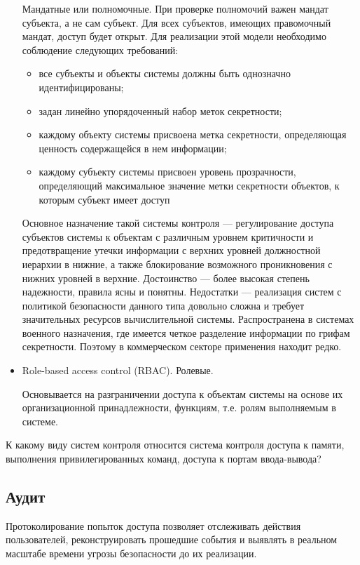 \begin{itemize}
Мандатные или полномочные. При проверке полномочий важен мандат субъекта, а не сам субъект. Для всех субъектов, имеющих правомочный мандат, доступ будет открыт.
Для реализации этой модели необходимо соблюдение следующих требований:
\begin{itemize}
\item все субъекты и объекты системы должны быть однозначно идентифицированы;
\item задан линейно упорядоченный набор меток секретности;
\item каждому объекту системы присвоена метка секретности, определяющая ценность содержащейся в нем информации;
\item каждому субъекту системы присвоен уровень прозрачности, определяющий максимальное значение метки секретности объектов, к которым субъект имеет доступ
\end{itemize}

Основное назначение такой системы контроля --- регулирование доступа субъектов системы к объектам с различным уровнем критичности и предотвращение утечки информации с верхних уровней должностной иерархии в нижние, а также блокирование возможного проникновения с нижних уровней в верхние.
Достоинство --- более высокая степень надежности, правила ясны и понятны.
Недостатки --- реализация систем с политикой безопасности данного типа довольно сложна и требует значительных ресурсов вычислительной системы. Распространена в системах военного назначения, где имеется четкое разделение информации по грифам секретности. Поэтому в коммерческом секторе применения находит редко.

\item Role-based access control (RBAC). Ролевые. 

Основывается на разграничении доступа к объектам системы на основе их организационной принадлежности, функциям, т.е. ролям выполняемым в системе.

\end{itemize}


К какому виду систем контроля относится система контроля доступа к памяти, выполнения привилегированных команд, доступа к портам ввода-вывода?


\subsection{Аудит}

Протоколирование попыток доступа позволяет отслеживать действия пользователей,  реконструировать прошедшие события и выявлять в реальном масштабе времени угрозы безопасности до их реализации.

